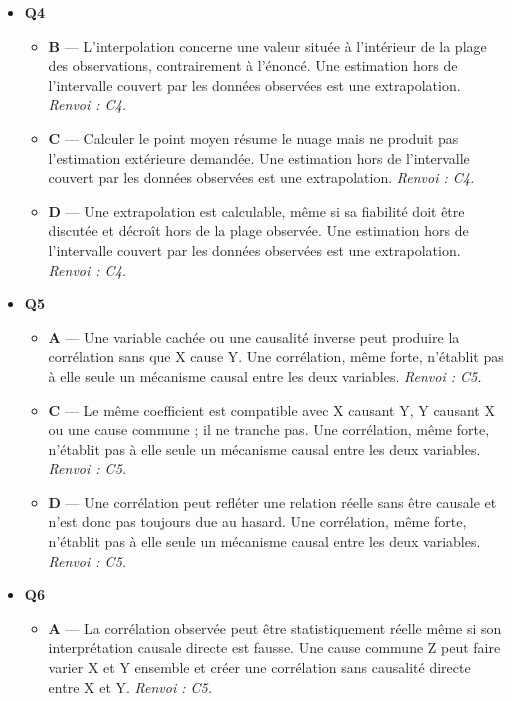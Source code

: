 \begin{itemize}
\begin{itemize}
    \item \textbf{D} — Le logarithme transforme effectivement le produit et la puissance en somme et coefficient, donc un changement est possible. Prendre les logarithmes donne ln(y)=ln(A)+b ln(x), relation affine entre X=ln(x) et Y=ln(y). \emph{Renvoi : C3.}
  \end{itemize}
  \item \textbf{Q4}
  \begin{itemize}
    \item \textbf{B} — L'interpolation concerne une valeur située à l'intérieur de la plage des observations, contrairement à l'énoncé. Une estimation hors de l'intervalle couvert par les données observées est une extrapolation. \emph{Renvoi : C4.}
    \item \textbf{C} — Calculer le point moyen résume le nuage mais ne produit pas l'estimation extérieure demandée. Une estimation hors de l'intervalle couvert par les données observées est une extrapolation. \emph{Renvoi : C4.}
    \item \textbf{D} — Une extrapolation est calculable, même si sa fiabilité doit être discutée et décroît hors de la plage observée. Une estimation hors de l'intervalle couvert par les données observées est une extrapolation. \emph{Renvoi : C4.}
  \end{itemize}
  \item \textbf{Q5}
  \begin{itemize}
    \item \textbf{A} — Une variable cachée ou une causalité inverse peut produire la corrélation sans que X cause Y. Une corrélation, même forte, n'établit pas à elle seule un mécanisme causal entre les deux variables. \emph{Renvoi : C5.}
    \item \textbf{C} — Le même coefficient est compatible avec X causant Y, Y causant X ou une cause commune ; il ne tranche pas. Une corrélation, même forte, n'établit pas à elle seule un mécanisme causal entre les deux variables. \emph{Renvoi : C5.}
    \item \textbf{D} — Une corrélation peut refléter une relation réelle sans être causale et n'est donc pas toujours due au hasard. Une corrélation, même forte, n'établit pas à elle seule un mécanisme causal entre les deux variables. \emph{Renvoi : C5.}
  \end{itemize}
  \item \textbf{Q6}
  \begin{itemize}
    \item \textbf{A} — La corrélation observée peut être statistiquement réelle même si son interprétation causale directe est fausse. Une cause commune Z peut faire varier X et Y ensemble et créer une corrélation sans causalité directe entre X et Y. \emph{Renvoi : C5.}

\end{itemize}
\end{itemize}
